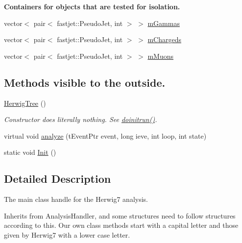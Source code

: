 \begin{Indent}{\bf Containers for objects that are tested for isolation.}\par
\begin{DoxyCompactItemize}
\item 
vector$<$ pair$<$ fastjet\+::\+Pseudo\+Jet, int $>$ $>$ \hyperlink{class_herwig_1_1_herwig_tree_a5cb588d629626d524e56d88b93082d3a}{m\+Gammas}
\item 
vector$<$ pair$<$ fastjet\+::\+Pseudo\+Jet, int $>$ $>$ \hyperlink{class_herwig_1_1_herwig_tree_a9c61c42232484ac6b345ef8720131a5c}{m\+Chargeds}
\item 
vector$<$ pair$<$ fastjet\+::\+Pseudo\+Jet, int $>$ $>$ \hyperlink{class_herwig_1_1_herwig_tree_a03ab2e508845e15bd0967a055d5fc45b}{m\+Muons}
\end{DoxyCompactItemize}
\end{Indent}
\subsection*{Methods visible to the outside.}
\begin{DoxyCompactItemize}
\item 
\hyperlink{class_herwig_1_1_herwig_tree_a02551fe885aebae778e2df85f5f810f6}{Herwig\+Tree} ()
\begin{DoxyCompactList}\small\item\em Constructor does literally nothing. See \hyperlink{class_herwig_1_1_herwig_tree_ad6dce6737790c0e08f0f74b304f875ad}{doinitrun()}. \end{DoxyCompactList}\item 
virtual void \hyperlink{class_herwig_1_1_herwig_tree_ae478dd545ede60f68fdd161d61d74fee}{analyze} (t\+Event\+Ptr event, long ieve, int loop, int state)
\item 
static void \hyperlink{class_herwig_1_1_herwig_tree_a3cd627f436988cb65b02bc6b38c73ccc}{Init} ()
\end{DoxyCompactItemize}


\subsection{Detailed Description}
The main class handle for the Herwig7 analysis. 

Inherits from Analysis\+Handler, and some structures need to follow structures according to this. Our own class methods start with a capital letter and those given by Herwig7 with a lower case letter. 

